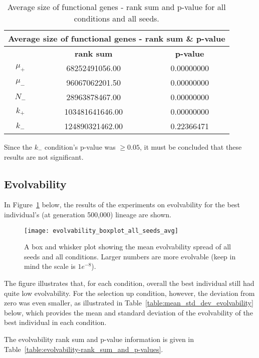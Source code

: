 \begin{table}[H]
	\begin{tabular}{|c|c|c|}
		\hline
		\multicolumn{3}{c}{\Large \textbf{Average size of functional genes - rank sum \& p-value}} \\
		\hline
		& \textbf{rank sum} & \textbf{p-value} \\
		\hline
		$\mu_+$ & 68252491056.00 & 0.00000000 \\ 
		\hline
		$\mu_-$ & 96067062201.50 & 0.00000000 \\ 
		\hline
		$N_-$ & 28963878467.00 & 0.00000000 \\ 
		\hline
		$k_+$ & 103481641646.00 & 0.00000000 \\ 
		\hline
		$k_-$ & 124890321462.00 & 0.22366471 \\ 
		\hline
	\end{tabular}
	\caption[Average size of functional genes - rank sum and p-value]{Average size of functional genes - rank sum and p-value for all conditions and all seeds.}
	\label{table:avg_size_of_functional_genes_rank_sum_and_p-value}
\end{table}
Since the $k_-$ condition's p-value was $\geq0.05$, it must be concluded that these results are not significant. 

\subsection{Evolvability}
In Figure~\ref{fig:evolvability_mean} below, the results of the experiments on evolvability for the best individual's (at generation 500,000) lineage are shown. 
\begin{figure}[H]
	\centering
	\texttt{[image: evolvability\_boxplot\_all\_seeds\_avg]}
	\caption[Evolvability boxplot]{A box and whisker plot showing the mean evolvability spread of all seeds and all conditions. Larger numbers are more evolvable (keep in mind the scale is $1e^{-8}$). }
	\label{fig:evolvability_mean}	
\end{figure}
The figure illustrates that, for each condition, overall the best individual still had quite low evolvability. For the selection up condition, however, the deviation from zero was even smaller, as illustrated in Table~\ref{table:mean_std_dev_evolvability} below, which provides the mean and standard deviation of the evolvability of the best individual in each condition. 

The evolvability rank sum and p-value information is given in Table~\ref{table:evolvability-rank_sum_and_p-values}.

